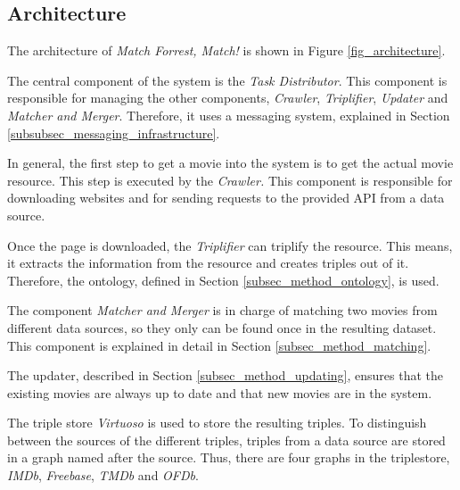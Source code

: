 \subsection{Architecture}
\label{subsec_method_architecture}

The architecture of \emph{Match Forrest, Match!} is shown in Figure \ref{fig_architecture}.

The central component of the system is the \textit{Task Distributor}.
This component is responsible for managing the other components, \textit{Crawler}, \textit{Triplifier}, \textit{Updater} and \textit{Matcher and Merger}.
Therefore, it uses a messaging system, explained in Section \ref{subsubsec_messaging_infrastructure}.

In general, the first step to get a movie into the system is to get the actual movie resource.
This step is executed by the \textit{Crawler.}
This component is responsible for downloading websites and for sending requests to the provided API from a data source.

Once the page is downloaded, the \textit{Triplifier} can triplify the resource.
This means, it extracts the information from the resource and creates triples out of it.
Therefore, the ontology, defined in Section \ref{subsec_method_ontology}, is used.

The component \textit{Matcher and Merger} is in charge of matching two movies from different data sources, so they only can be found once in the resulting dataset.
This component is explained in detail in Section \ref{subsec_method_matching}.

The updater, described in Section \ref{subsec_method_updating}, ensures that the existing movies are always up to date and that new movies are in the system.

The triple store \textit{Virtuoso} is used to store the resulting triples.
To distinguish between the sources of the different triples, triples from a data source are stored in a graph named after the source.
Thus, there are four graphs in the triplestore, \textit{IMDb}, \textit{Freebase}, \textit{TMDb} and \textit{OFDb}.

